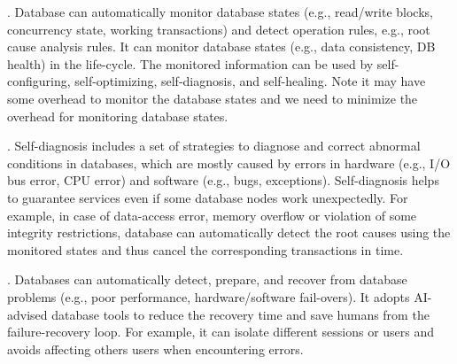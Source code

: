 . Database can automatically monitor database states (e.g., read/write blocks, concurrency state, working transactions) and detect operation rules, e.g., root cause analysis rules. It can monitor database states (e.g., data consistency, DB health) in the life-cycle. The monitored information can be used by self-configuring, self-optimizing, self-diagnosis, and self-healing. Note it may have some overhead to monitor the database states and we need to minimize the overhead for monitoring database states. %



. Self-diagnosis includes a set of strategies to diagnose and correct abnormal conditions in databases, which are mostly caused by errors in hardware (e.g., I/O bus error, CPU error) and software (e.g., bugs, exceptions). Self-diagnosis helps to guarantee services even if some database nodes work unexpectedly. For example, in case of data-access error, memory overflow or violation of some integrity restrictions, database can automatically detect the root causes using the monitored states and thus cancel the corresponding transactions in time. 






. Databases can automatically detect, prepare, and recover from database problems (e.g., poor performance, hardware/software fail-overs). It adopts AI-advised database tools to reduce the recovery time and save humans from the failure-recovery loop. For example, it can isolate different sessions or users and avoids affecting others users when encountering errors.  %



